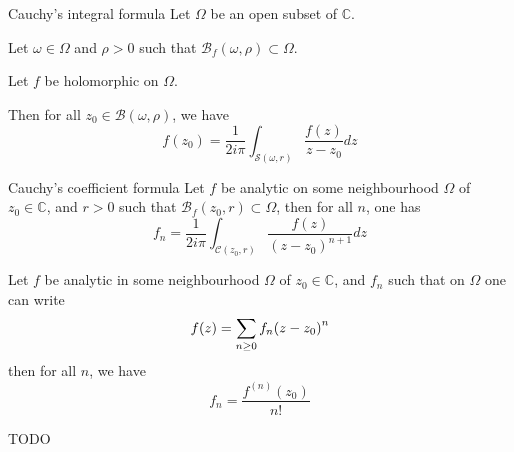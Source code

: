 \documentclass[../main.tex]{subfiles}
\begin{document}
\begin{thm}{Cauchy's integral formula}\label{thm_cauchy_integral}
	Let $\Omega$ be an open subset of $\mathbb{C}$.
	
	Let $\omega \in \Omega$ and $\rho > 0$ such that
	$\mathcal{B}_f (\omega, \rho) \subset \Omega$.
	
	Let $f$ be holomorphic on $\Omega$.
	
	Then for all $z_0 \in \mathcal{B} (\omega, \rho)$, we have
	\begin{equation*}
		f(z_0) = \frac{1}{2 i \pi} \int_{\mathcal{S} (\omega, r)} \frac{f(z)}{z - z_0} dz
	\end{equation*}
\end{thm}

\begin{cor}{Cauchy's coefficient formula}\label{thm_cauchy_coefficients}
	Let $f$ be analytic on some neighbourhood $\Omega$ of $z_0 \in \mathbb{C}$, and $r > 0$ such that $\mathcal{B}_f (z_0, r) \subset \Omega$, then for all $n$, one has
	\[
	f_n = \frac{1}{2i\pi} \int_{\mathcal{C} (z_0, r)}
	\frac{f(z)}{{(z - z_0)}^{n+1}} dz
	\]
\end{cor}

\begin{thm}{}
	Let $f$ be analytic in some neighbourhood $\Omega$ of $z_0 \in \mathbb{C}$, and $f_n$ such that on $\Omega$ one can write
	$$
	f(z) = \sum\limits_{n \geq 0} f_n {(z - z_0)}^n
	$$
	then for all $n$, we have
	$$
	f_n = \frac{f^{(n)}(z_0)}{n!}
	$$
\end{thm}


TODO

%
%	
%
%	
%	
%
\end{document}
